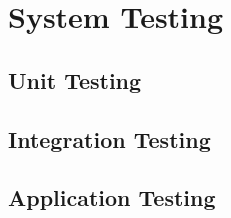 \section{System Testing}


\subsection{Unit Testing}

\subsection{Integration Testing}

\subsection{Application Testing}